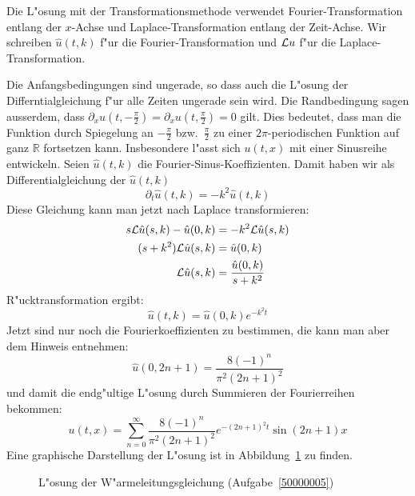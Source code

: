 \begin{loesung}
Die L"osung mit der Transformationsmethode
verwendet Fourier-Transformation
entlang der $x$-Achse und Laplace-Transformation entlang der Zeit-Achse.
Wir schreiben $\hat u(t,k)$ f"ur die Fourier-Transformation und ${\cal L} u$
f"ur die Laplace-Transformation.

Die Anfangsbedingungen sind ungerade, so dass auch die L"osung der
Differntialgleichung f"ur alle Zeiten ungerade sein wird. Die
Randbedingung sagen ausserdem, dass
$\partial_xu(t,-\frac{\pi}2)=\partial_xu(t,\frac{\pi}2)=0$ gilt.
Dies bedeutet, dass man die Funktion durch Spiegelung an
$-\frac{\pi}2$ bzw.~$\frac{\pi}2$ zu einer $2\pi$-periodischen
Funktion auf ganz $\mathbb R$ fortsetzen kann. Insbesondere l"asst
sich $u(t,x)$ mit einer Sinusreihe entwickeln. Seien $\hat u(t,k)$
die Fourier-Sinus-Koeffizienten. Damit haben wir als Differentialgleichung
der $\hat u(t,k)$
\[
\partial_t\hat u(t,k)=-k^2\hat u(t,k)
\]
Diese Gleichung kann man jetzt nach Laplace transformieren:
\begin{align*}
s{\cal L}\hat u(s,k) - \hat u(0,k)&=-k^2 {\cal L}\hat u(s,k)\\
(s+k^2){\cal L}\hat u(s,k)&=\hat u(0,k)\\
{\cal L}\hat u(s,k)&=\frac{\hat u(0,k)}{s+k^2}
\end{align*}
R"ucktransformation ergibt:
\[
\hat u(t,k)=\hat u(0,k) e^{-k^2t}
\]
Jetzt sind nur noch die Fourierkoeffizienten zu bestimmen, die kann
man aber dem Hinweis entnehmen:
\[
\hat u(0,2n+1)=
\frac{8(-1)^n}{\pi^2(2n+1)^2}
\]
und damit die endg"ultige L"osung durch Summieren der Fourierreihen bekommen:
\[
u(t,x)=
\sum_{n=0}^\infty \frac{8(-1)^n}{\pi^2(2n+1)^2}e^{-(2n+1)^2t}\sin(2n+1)x
\]
Eine graphische Darstellung der L"osung ist in Abbildung~\ref{50000005:bild}
zu finden.
\begin{figure}
\begin{center}
\end{center}
\caption{L"osung der W"armeleitungsgleichung (Aufgabe~\ref{50000005})
\label{50000005:bild}}
\end{figure}
\end{loesung}
